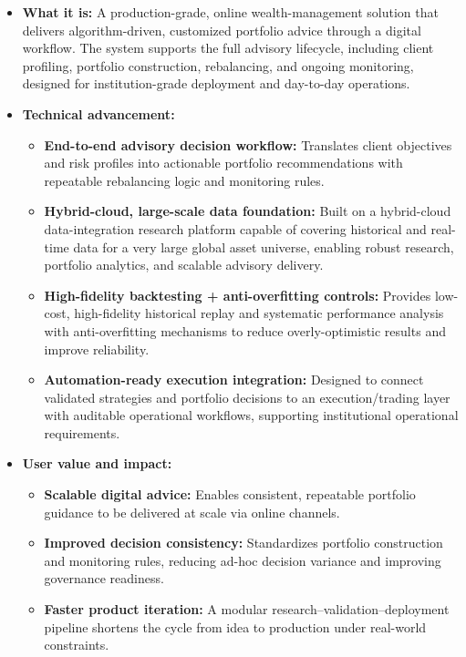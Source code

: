 \documentclass[11pt]{article}
\newenvironment{tightitemize}{%
  \begin{itemize}[leftmargin=*,nosep,topsep=2pt]
}{\end{itemize}}
\begin{document}
\begin{tightitemize}
  \item \textbf{What it is:} A production-grade, online wealth-management solution that delivers algorithm-driven, customized portfolio advice through a digital workflow. The system supports the full advisory lifecycle, including client profiling, portfolio construction, rebalancing, and ongoing monitoring, designed for institution-grade deployment and day-to-day operations.

  \item \textbf{Technical advancement:}
  \begin{tightitemize}
    \item \textbf{End-to-end advisory decision workflow:} Translates client objectives and risk profiles into actionable portfolio recommendations with repeatable rebalancing logic and monitoring rules.
    \item \textbf{Hybrid-cloud, large-scale data foundation:} Built on a hybrid-cloud data-integration research platform capable of covering historical and real-time data for a very large global asset universe, enabling robust research, portfolio analytics, and scalable advisory delivery.
    \item \textbf{High-fidelity backtesting + anti-overfitting controls:} Provides low-cost, high-fidelity historical replay and systematic performance analysis with anti-overfitting mechanisms to reduce overly-optimistic results and improve reliability.
    \item \textbf{Automation-ready execution integration:} Designed to connect validated strategies and portfolio decisions to an execution/trading layer with auditable operational workflows, supporting institutional operational requirements.
  \end{tightitemize}

  \item \textbf{User value and impact:}
  \begin{tightitemize}
    \item \textbf{Scalable digital advice:} Enables consistent, repeatable portfolio guidance to be delivered at scale via online channels.
    \item \textbf{Improved decision consistency:} Standardizes portfolio construction and monitoring rules, reducing ad-hoc decision variance and improving governance readiness.
    \item \textbf{Faster product iteration:} A modular research--validation--deployment pipeline shortens the cycle from idea to production under real-world constraints.
  \end{tightitemize}


\end{tightitemize}
\end{document}
